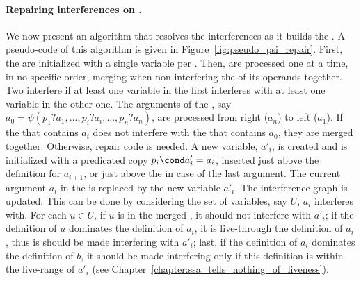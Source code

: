 \paragraph{Repairing interferences on \psifuns.}
We now present an algorithm that resolves the interferences as it builds the \psiwebs. A \index{\psiweb}
pseudo-code of this algorithm is given in
Figure~\ref{fig:pseudo_psi_repair}.
First, the \psiwebs are initialized with a single variable per \psiweb. Then,
\psifuns are processed one at a time, in no specific order, merging when non-interfering the \psiwebs of its operands together.
Two \psiwebs interfere if at least one variable in
the first \psiweb interferes with at least one variable in the
other one.
The arguments of the \psifun, say ${a_0 = \psi(p_1?a_1, ..., p_i?a_i, ...,
  p_n?a_n)}$, are processed
from right ($a_n$) to left ($a_1$). If the \psiweb that contains $a_i$ does not interfere with the \psiweb that contains $a_0$, they are merged together.
Otherwise, repair code is
needed. A new variable, ${a'_i}$, is created and is initialized
with a predicated copy ${p_i\cond a'_i = a_i}$, inserted just above
the definition for ${a_{i+1}}$, or just above the \psifun in case of the last argument. The current argument ${a_i}$ in
the \psifun is replaced by the new variable ${a'_i}$. The
interference graph is updated. This can be done by considering the set of variables, say $U$, $a_i$ interferes with. For each $u\in U$, if $u$ is in the merged \psiweb, it should not interfere with $a'_i$; if the definition of $u$ dominates the definition of $a_i$, it is live-through the definition of $a_i$, thus is should be made interfering with $a'_i$; last, if the definition of $a_i$ dominates the definition of $b$, it should be made interfering only if this definition is within the live-range of $a'_i$ (see Chapter~\ref{chapter:ssa_tells_nothing_of_liveness}).

